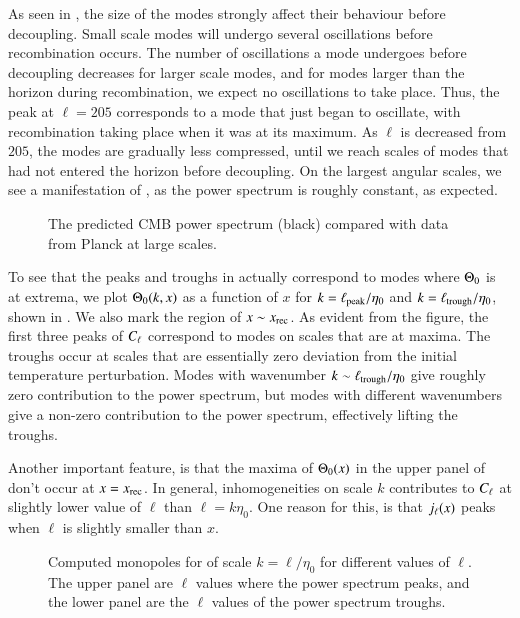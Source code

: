 As seen in , the size of the modes strongly affect their behaviour before decoupling. Small scale modes will undergo several oscillations before recombination occurs. The number of oscillations a mode undergoes before decoupling decreases for larger scale modes, and for modes larger than the horizon during recombination, we expect no oscillations to take place. Thus, the peak at $\ell=205$ corresponds to a mode that just began to oscillate, with recombination taking place when it was at its maximum. As $\ell$ is decreased from $205$, the modes are gradually less compressed, until we reach scales of modes that had not entered the horizon before decoupling. On the largest angular scales, we see a manifestation of , as the power spectrum is roughly constant, as expected. 
\begin{figure}[ht!]
    \caption{The predicted CMB power spectrum (black) compared with data from Planck at large scales. }
    \label{fig:M4:results:peaks_and_troughs_cells}
\end{figure}

To see that the peaks and troughs in  actually correspond to modes where $\Theta_0$ is at extrema, we plot $\Theta_0(k,x)$ as a function of $x$ for $k=\ell_\mathrm{peak}/\eta_0$ and $k=\ell_\mathrm{trough}/\eta_0$, shown in . We also mark the region of $x\sim x_\mathrm{rec}$. As evident from the figure, the first three peaks of $C_\ell$ correspond to modes on scales that are at maxima. The troughs occur at scales that are essentially zero deviation from the initial temperature perturbation. Modes with wavenumber $k\sim\ell_\mathrm{trough}/\eta_0$ give roughly zero contribution to the power spectrum, but modes with different wavenumbers give a non-zero contribution to the power spectrum, effectively lifting the troughs. 

Another important feature, is that the maxima of $\Theta_0(x)$ in the upper panel of  don't occur at $x=x_\mathrm{rec}$. In general, inhomogeneities on scale $k$ contributes to $C_\ell$ at slightly lower value of $\ell$ than $\ell=k\eta_0$. One reason for this, is that $j_\ell(x)$ peaks when $\ell$ is slightly smaller than $x$. 
\begin{figure}[ht!] 
    \caption{Computed monopoles for of scale $k=\ell/\eta_0$ for different values of $\ell$. The upper panel are $\ell$ values where the power spectrum peaks, and the lower panel are the $\ell$ values of the power spectrum troughs.}
    \label{fig:M4:results:theta0_at_peaks_and_troughs}
\end{figure}

